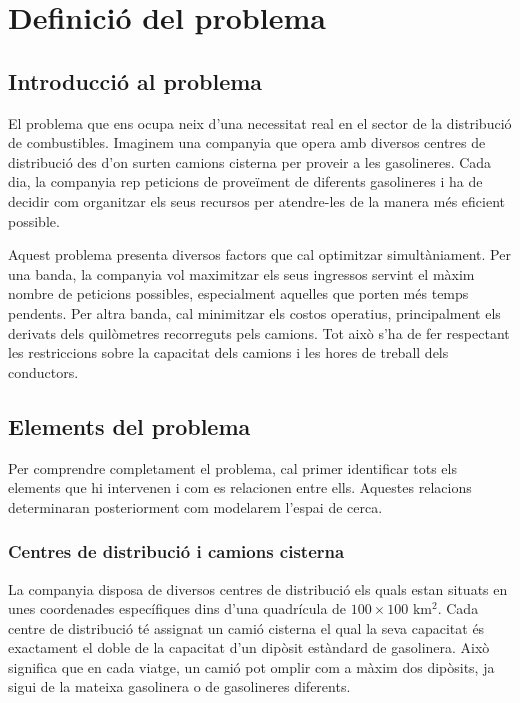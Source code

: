 
\section{Definició del problema}
\label{sec:problem}

\subsection{Introducció al problema}

El problema que ens ocupa neix d'una necessitat real en el sector de la distribució de combustibles. Imaginem una companyia que opera amb diversos centres de distribució des d'on surten camions cisterna per proveir a les gasolineres. Cada dia, la companyia rep peticions de proveïment de diferents gasolineres i ha de decidir com organitzar els seus recursos per atendre-les de la manera més eficient possible.

Aquest problema presenta diversos factors que cal optimitzar simultàniament. Per una banda, la companyia vol maximitzar els seus ingressos servint el màxim nombre de peticions possibles, especialment aquelles que porten més temps pendents. Per altra banda, cal minimitzar els costos operatius, principalment els derivats dels quilòmetres recorreguts pels camions. Tot això s'ha de fer respectant les restriccions sobre la capacitat dels camions i les hores de treball dels conductors.

\subsection{Elements del problema}

Per comprendre completament el problema, cal primer identificar tots els elements que hi intervenen i com es relacionen entre ells. Aquestes relacions determinaran posteriorment com modelarem l'espai de cerca.

\subsubsection{Centres de distribució i camions cisterna}

La companyia disposa de diversos centres de distribució els quals estan situats en unes coordenades específiques dins d'una quadrícula de $100 \times 100$ km$^2$. Cada centre de distribució té assignat un camió cisterna el qual la seva capacitat és exactament el doble de la capacitat d'un dipòsit estàndard de gasolinera. Això significa que en cada viatge, un camió pot omplir com a màxim dos dipòsits, ja sigui de la mateixa gasolinera o de gasolineres diferents.

